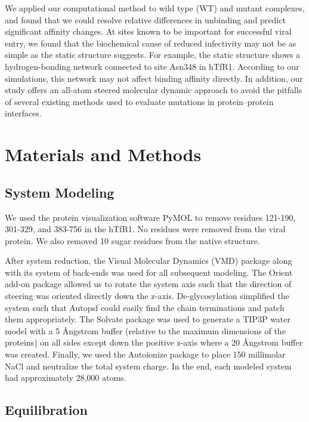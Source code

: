 \documentclass[12pt]{article} %
\providecommand{\DIFaddbegin}{} %
\providecommand{\DIFaddend}{} %
\providecommand{\DIFdelbegin}{} %
\providecommand{\DIFdelend}{} %
\begin{document}
We applied our computational method to wild type (WT) and mutant complexes, and found that we could resolve relative differences in unbinding and predict significant affinity changes. At sites known to be important for successful viral entry, we found that the biochemical cause of reduced infectivity may not be as simple as the static structure suggests. For example, the static structure shows a hydrogen-bonding network connected to site Asn348 in hTfR1. According to our simulations, this network may not affect binding affinity directly. In addition, our study offers an all-atom steered molecular dynamic approach to avoid the pitfalls of several existing methods used to evaluate mutations in protein--protein interfaces.

\section{Materials and Methods}

\subsection{System Modeling}

We used the protein visualization software PyMOL \DIFdelbegin %
\DIFdelend \DIFaddbegin \citep{PyMOL} \DIFaddend to remove residues 121-190, 301-329, and 383-756 in the hTfR1. No residues were removed from the viral protein. We also removed 10 sugar residues from the native structure.

After system reduction, the Visual Molecular Dynamics (VMD) \DIFdelbegin %
\DIFdelend \DIFaddbegin \citep{Humphrey1996} \DIFaddend package along with its system of back-ends was used for all subsequent modeling. The Orient add-on package allowed us to rotate the system axis such that the direction of steering was oriented directly down the z-axis. De-glycosylation simplified the system such that Autopsf could easily find the chain terminations and patch them appropriately. The Solvate package was used to generate a TIP3P water model with a 5 \AA ngstrom buffer (relative to the maximum dimensions of the proteins) on all sides except down the positive z-axis where a 20 \AA ngstrom buffer was created. Finally, we used the Autoionize package to place 150 millimolar NaCl and neutralize the total system charge. In the end, each modeled system had approximately 28,000 atoms.

\subsection{Equilibration}
\end{document}
